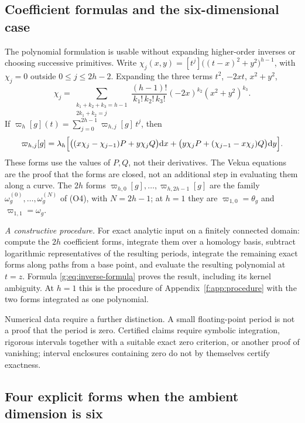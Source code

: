\documentclass[11pt,a4paper]{article}
\numberwithin{equation}{section}
\theoremstyle{definition}
\theoremstyle{remark}
\theoremstyle{plain}
\newcommand{\om}{\omega}
\newcommand{\thet}{\theta}
\newcommand{\dd}{\mathrm d}
\newcommand{\cur}{\varpi}                         %
\begin{document}
\subsection{Coefficient formulas and the six-dimensional case}
\label{g:sub:coefficients}

The polynomial formulation is usable without expanding higher-order inverses
or choosing successive primitives. Write
$\chi_j(x,y)=[t^j]\bigl((t-x)^2+y^2\bigr)^{h-1}$, with $\chi_j=0$ outside
$0\le j\le2h-2$. Expanding the three terms $t^2$, $-2xt$, $x^2+y^2$,
\begin{equation}\label{g:eq:chi-coefficients}
 \chi_j=\sum_{\substack{k_1+k_2+k_3=h-1\\2k_1+k_2=j}}
 \frac{(h-1)!}{k_1!\,k_2!\,k_3!}(-2x)^{k_2}(x^2+y^2)^{k_3}.
\end{equation}
If $\cur_h[g](t)=\sum_{j=0}^{2h-1}\cur_{h,j}[g]\,t^j$, then
\begin{equation}\label{g:eq:coefficient-forms}
 \cur_{h,j}[g]=\lambda_h\Bigl[\bigl((x\chi_j-\chi_{j-1})P+y\chi_jQ\bigr)\dd x
 +\bigl(y\chi_jP+(\chi_{j-1}-x\chi_j)Q\bigr)\dd y\Bigr].
\end{equation}
These forms use the values of $P,Q$, not their derivatives. The Vekua
equations are the proof that the forms are closed, not an additional step in
evaluating them along a curve. The $2h$ forms $\cur_{h,0}[g],\dots,
\cur_{h,2h-1}[g]$ are the family $\om^{(0)}_g,\dots,\om^{(N)}_g$ of (O4), with
$N=2h-1$; at $h=1$ they are $\cur_{1,0}=\thet_g$ and $\cur_{1,1}=\om_g$.

\emph{A constructive procedure.} For exact analytic input on a finitely
connected domain: compute the $2h$ coefficient forms, integrate them over a
homology basis, subtract logarithmic representatives of the resulting
periods, integrate the remaining exact forms along paths from a base point,
and evaluate the resulting polynomial at $t=z$. Formula
\eqref{g:eq:inverse-formula} proves the result, including its kernel
ambiguity. At $h=1$ this is the procedure of Appendix~\ref{f:app:procedure} with the two forms
integrated as one polynomial.

Numerical data require a further distinction. A small floating-point period is
not a proof that the period is zero. Certified claims require symbolic
integration, rigorous intervals together with a suitable exact zero
criterion, or another proof of vanishing; interval enclosures containing zero
do not by themselves certify exactness.

\subsection{Four explicit forms when the ambient dimension is six}
\label{g:sub:six}
\end{document}
